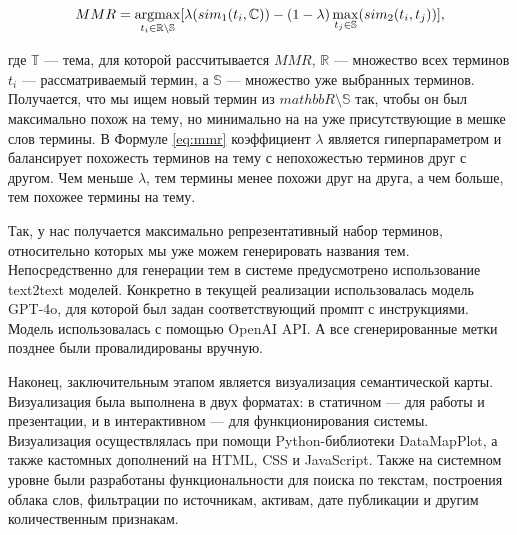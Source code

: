 \begin{equation}\label{eq:mmr}
    MMR =
    \argmax_{
        t_i \in \mathbb{R} \setminus \mathbb{S}
    }[
        \lambda(sim_1(t_i,\mathbb{C})) - (1 - \lambda)\max_{t_j \in \mathbb{S}}(sim_2(t_i, t_j))
    ],
\end{equation}

где $\mathbb{T}$ --- тема, для которой рассчитывается $MMR$, $\mathbb{R}$ --- множество всех терминов $t_i$ --- рассматриваемый термин,
а $\mathbb{S}$ — множество уже выбранных терминов. Получается, что мы ищем новый термин из $mathbb{R} \setminus \mathbb{S}$ так,
чтобы он был максимально похож на тему, но минимально на на уже присутствующие в мешке слов термины. В Формуле \ref{eq:mmr}
коэффициент $\lambda$ является гиперпараметром и балансирует похожесть терминов на тему с непохожестью терминов друг с другом.
Чем меньше $\lambda$, тем термины менее похожи друг на друга, а чем больше, тем похожее термины на тему.

Так, у нас получается максимально репрезентативный набор терминов, относительно которых мы уже можем генерировать названия тем.
Непосредственно для генерации тем в системе предусмотрено использование text2text моделей. Конкретно в текущей реализации
использовалась модель GPT-4o, для которой был задан соответствующий промпт с инструкциями.
Модель использовалась с помощью OpenAI API. А все сгенерированные метки позднее были провалидированы вручную.

Наконец, заключительным этапом является визуализация семантической карты. Визуализация была выполнена
в двух форматах: в статичном --- для работы и презентации, и в интерактивном --- для функционирования системы.
Визуализация осуществлялась при помощи Python-библиотеки DataMapPlot, а также кастомных дополнений на HTML,
CSS и JavaScript. Также на системном уровне были разработаны функциональности для поиска по текстам,
построения облака слов, фильтрации по источникам, активам, дате публикации и другим количественным признакам.